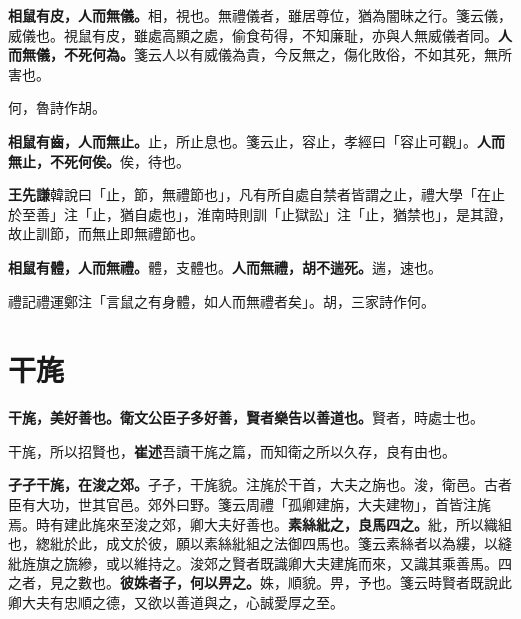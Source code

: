 \textbf{相鼠有皮，人而無儀。}{\footnotesize 相，視也。無禮儀者，雖居尊位，猶為闇昧之行。箋云儀，威儀也。視鼠有皮，雖處高顯之處，偷食苟得，不知廉耻，亦與人無威儀者同。}\textbf{人而無儀，不死何為。}{\footnotesize 箋云人以有威儀為貴，今反無之，傷化敗俗，不如其死，無所害也。}

\begin{quoting}何，魯詩作胡。\end{quoting}

\textbf{相鼠有齒，人而無止。}{\footnotesize 止，所止息也。箋云止，容止，孝經曰「容止可觀」。}\textbf{人而無止，不死何俟。}{\footnotesize 俟，待也。}

\begin{quoting}\textbf{王先謙}韓說曰「止，節，無禮節也」，凡有所自處自禁者皆謂之止，禮大學「在止於至善」注「止，猶自處也」，淮南時則訓「止獄訟」注「止，猶禁也」，是其證，故止訓節，而無止即無禮節也。\end{quoting}

\textbf{相鼠有體，人而無禮。}{\footnotesize 體，支體也。}\textbf{人而無禮，胡不遄死。}{\footnotesize 遄，速也。}

\begin{quoting}禮記禮運鄭注「言鼠之有身體，如人而無禮者矣」。胡，三家詩作何。\end{quoting}

\section{干旄}


\textbf{干旄，美好善也。衛文公臣子多好善，賢者樂告以善道也。}{\footnotesize 賢者，時處士也。}

\begin{quoting}干旄，所以招賢也，\textbf{崔述}吾讀干旄之篇，而知衛之所以久存，良有由也。\end{quoting}

\textbf{孑孑干旄，在浚之郊。}{\footnotesize 孑孑，干旄貌。注旄於干首，大夫之旃也。浚，衛邑。古者臣有大功，世其官邑。郊外曰野。箋云周禮「孤卿建旃，大夫建物」，首皆注旄焉。時有建此旄來至浚之郊，卿大夫好善也。}\textbf{素絲紕之，良馬四之。}{\footnotesize 紕，所以織組也，緫紕於此，成文於彼，願以素絲紕組之法御四馬也。箋云素絲者以為縷，以縫紕旌旗之旒縿，或以維持之。浚郊之賢者既識卿大夫建旄而來，又識其乘善馬。四之者，見之數也。}\textbf{彼姝者子，何以畀之。}{\footnotesize 姝，順貌。畀，予也。箋云時賢者既說此卿大夫有忠順之德，又欲以善道與之，心誠愛厚之至。}

